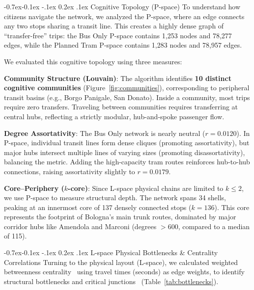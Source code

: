 \documentclass[12pt, a4paper]{article}
\makeatletter
\renewcommand\subsubsection{\@startsection{subsubsection}{3}{\z@}%
                                     {-0.7ex\@plus -0.1ex \@minus -.1ex}%
                                     {0.2ex \@plus .1ex}%
                                     {\normalfont\normalsize\bfseries}}
\let\olditemize\itemize
\let\endolditemize\enditemize
\renewenvironment{itemize}{\olditemize\setlength{\itemsep}{0pt}\setlength{\parskip}{0pt}\setlength{\parsep}{0pt}\setlength{\topsep}{0pt}\setlength{\partopsep}{0pt}}{\endolditemize}
\makeatother
\begin{document}
\subsubsection{Cognitive Topology (P-space)}
To understand how citizens navigate the network, we analyzed the P-space, where an edge connects any two stops sharing a transit line. This creates a highly dense graph of ``transfer-free'' trips: the Bus Only P-space contains 1,253 nodes and 78,277 edges, while the Planned Tram P-space contains 1,283 nodes and 78,957 edges.

We evaluated this cognitive topology using three measures:
\begin{itemize}
    \item \textbf{Community Structure (Louvain)}: The algorithm identifies \textbf{10 distinct cognitive communities} (Figure~\ref{fig:communities}), corresponding to peripheral transit basins (e.g., Borgo Panigale, San Donato). Inside a community, most trips require zero transfers. Traveling between communities requires transferring at central hubs, reflecting a strictly modular, hub-and-spoke passenger flow.
    \item \textbf{Degree Assortativity}: The Bus Only network is nearly neutral ($r = 0.0120$). In P-space, individual transit lines form dense cliques (promoting assortativity), but major hubs intersect multiple lines of varying sizes (promoting disassortativity), balancing the metric. Adding the high-capacity tram routes reinforces hub-to-hub connections, raising assortativity slightly to $r = 0.0179$.
    \item \textbf{Core--Periphery ($k$-core)}: Since L-space physical chains are limited to $k \le 2$, we use P-space to measure structural depth. The network spans 34 shells, peaking at an innermost core of 137 densely connected stops ($k=136$). This core represents the footprint of Bologna's main trunk routes, dominated by major corridor hubs like Amendola and Marconi (degrees $>600$, compared to a median of 115).
\end{itemize}

\subsubsection{L-space Physical Bottlenecks \& Centrality Correlations}
Turning to the physical layout (L-space), we calculated weighted betweenness centrality~\cite{brandes} using travel times (seconds) as edge weights, to identify structural bottlenecks and critical junctions~\cite{kopsidas} (Table~\ref{tab:bottlenecks}).
\end{document}
